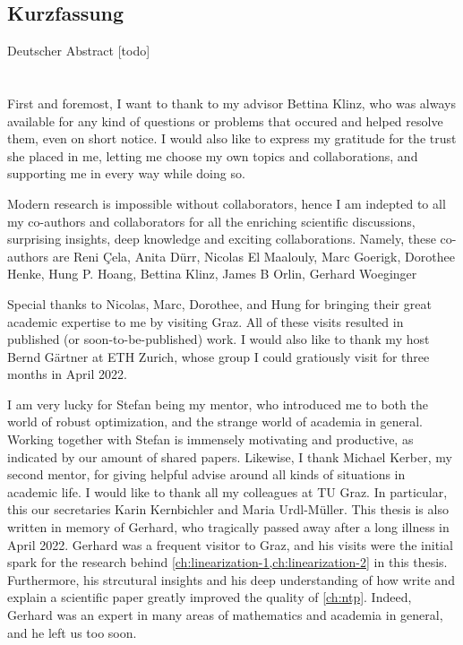 \documentclass[twoside,openright,bibliography=totoc]{scrreprt}
\begin{document}
\begin{otherlanguage}{ngerman}
\chapter*{Kurzfassung}
Deutscher Abstract [todo]
\end{otherlanguage}




\cleardoublepage

\chapter*{}

First and foremost, I want to thank to my advisor Bettina Klinz, who was always available for any kind of questions or problems that occured and helped resolve them, even on short notice. I would also like to express my gratitude for the trust she placed in me, letting me choose my own topics and collaborations, and supporting me in every way while doing so.

Modern research is impossible without collaborators, hence I am indepted to all my co-authors and collaborators for all the enriching scientific discussions, surprising insights, deep knowledge and exciting collaborations. Namely, these co-authors are Reni \c{C}ela, Anita Dürr, Nicolas El Maalouly, Marc Goerigk, Dorothee Henke, Hung P. Hoang, Bettina Klinz, James B Orlin, Gerhard Woeginger

Special thanks to Nicolas, Marc, Dorothee, and Hung for bringing their great academic expertise to me by visiting Graz. All of these visits resulted in published (or soon-to-be-published) work. I would also like to thank my host Bernd Gärtner at ETH Zurich, whose group I could gratiously visit for three months in April 2022.

I am very lucky for Stefan being my mentor, who introduced me to both the world of robust optimization, and the strange world of academia in general. Working together with Stefan is immensely motivating and productive, as indicated by our amount of shared papers. 
Likewise, I thank Michael Kerber, my second mentor, for giving helpful advise around all kinds of situations in academic life. 
I would like to thank all my colleagues at TU Graz. In particular, this our secretaries Karin Kernbichler and Maria Urdl-Müller. This thesis is also written in memory of Gerhard, who tragically passed away after a long illness in April 2022. Gerhard was a frequent visitor to Graz, and his visits were the initial spark for the research behind \cref{ch:linearization-1,ch:linearization-2} in this thesis. Furthermore, his strcutural insights and his deep understanding of how write and explain a scientific paper greatly improved the quality of \cref{ch:ntp}. Indeed, Gerhard was an expert in many areas of mathematics and academia in general, and he left us too soon.
\end{document}
